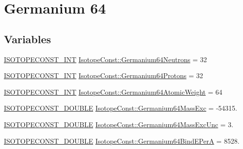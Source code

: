 \hypertarget{group___isotope_const-_germanium-_ge64}{}\section{Germanium 64}
\label{group___isotope_const-_germanium-_ge64}
\subsection*{Variables}
\begin{DoxyCompactItemize}
\item 
\mbox{\hyperlink{group___isotope_const-_macros_ga5f18360b3e99483a35c32d789e62621c}{I\+S\+O\+T\+O\+P\+E\+C\+O\+N\+S\+T\+\_\+\+I\+NT}} \mbox{\hyperlink{group___isotope_const-_germanium-_ge64_gaa611e1e1815c658b923baefb54d3b133}{Isotope\+Const\+::\+Germanium64\+Neutrons}} = 32
\item 
\mbox{\hyperlink{group___isotope_const-_macros_ga5f18360b3e99483a35c32d789e62621c}{I\+S\+O\+T\+O\+P\+E\+C\+O\+N\+S\+T\+\_\+\+I\+NT}} \mbox{\hyperlink{group___isotope_const-_germanium-_ge64_gacf3b5bdffe14a9358564f6cd99f77b60}{Isotope\+Const\+::\+Germanium64\+Protons}} = 32
\item 
\mbox{\hyperlink{group___isotope_const-_macros_ga5f18360b3e99483a35c32d789e62621c}{I\+S\+O\+T\+O\+P\+E\+C\+O\+N\+S\+T\+\_\+\+I\+NT}} \mbox{\hyperlink{group___isotope_const-_germanium-_ge64_ga708cb7b72d1d5d39651cf4b54ffb9766}{Isotope\+Const\+::\+Germanium64\+Atomic\+Weight}} = 64
\item 
\mbox{\hyperlink{group___isotope_const-_macros_ga8f45a7272ce02c0b4c65c44636ed719a}{I\+S\+O\+T\+O\+P\+E\+C\+O\+N\+S\+T\+\_\+\+D\+O\+U\+B\+LE}} \mbox{\hyperlink{group___isotope_const-_germanium-_ge64_ga61bbeb4c1588360ddc847c21dcd4a619}{Isotope\+Const\+::\+Germanium64\+Mass\+Exc}} = -\/54315.
\item 
\mbox{\hyperlink{group___isotope_const-_macros_ga8f45a7272ce02c0b4c65c44636ed719a}{I\+S\+O\+T\+O\+P\+E\+C\+O\+N\+S\+T\+\_\+\+D\+O\+U\+B\+LE}} \mbox{\hyperlink{group___isotope_const-_germanium-_ge64_gad2fd6d4ff3f3110cb31438b06056eea0}{Isotope\+Const\+::\+Germanium64\+Mass\+Exc\+Unc}} = 3.
\item 
\mbox{\hyperlink{group___isotope_const-_macros_ga8f45a7272ce02c0b4c65c44636ed719a}{I\+S\+O\+T\+O\+P\+E\+C\+O\+N\+S\+T\+\_\+\+D\+O\+U\+B\+LE}} \mbox{\hyperlink{group___isotope_const-_germanium-_ge64_ga07a87ebdb8c831f5ab5e424030705841}{Isotope\+Const\+::\+Germanium64\+Bind\+E\+PerA}} = 8528.
\item 

\end{DoxyCompactItemize}
